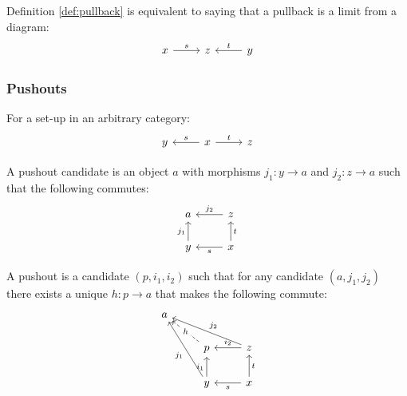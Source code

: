 \begin{definition}
  Definition \ref{def:pullback} is equivalent to saying that a pullback is a
  limit from a diagram:
  \[\begin{tikzcd}[ampersand replacement=\&]
    x \& z \& y
    \arrow["t"', from=1-3, to=1-2]
    \arrow["s", from=1-1, to=1-2]
  \end{tikzcd}\]
\end{definition}

\subsubsection*{Pushouts}

\begin{definition}
  For a set-up in an arbitrary category:
  \parencite{leinster:basic_category_theory}
  \[\begin{tikzcd}[ampersand replacement=\&]
    y \& x \& z
    \arrow["t", from=1-2, to=1-3]
    \arrow["s"', from=1-2, to=1-1]
  \end{tikzcd}\]

  A pushout candidate is an object $a$ with morphisms $j_1: y \to a$ and $j_2:
  z\to a$ such that the following commutes:
  \[\begin{tikzcd}[ampersand replacement=\&]
    a \& z \\
    y \& x
    \arrow["t"', from=2-2, to=1-2]
    \arrow["s", from=2-2, to=2-1]
    \arrow["{j_1}", from=2-1, to=1-1]
    \arrow["{j_2}"', from=1-2, to=1-1]
  \end{tikzcd}\]

  A pushout is a candidate $(p, i_1, i_2)$ such that for any candidate $(a,
  j_1, j_2)$ there exists a unique $h:p\to a$ that makes the following
  commute:
  \[\begin{tikzcd}[ampersand replacement=\&]
    a \\
    \& p \& z \\
    \& y \& x
    \arrow["t"', from=3-3, to=2-3]
    \arrow["s", from=3-3, to=3-2]
    \arrow["{i_1}", from=3-2, to=2-2]
    \arrow["{i_2}"', from=2-3, to=2-2]
    \arrow["h"{description}, dashed, from=2-2, to=1-1]
    \arrow["{j_1}", from=3-2, to=1-1]
    \arrow["{j_2}"', from=2-3, to=1-1]
  \end{tikzcd}\]
\end{definition}

